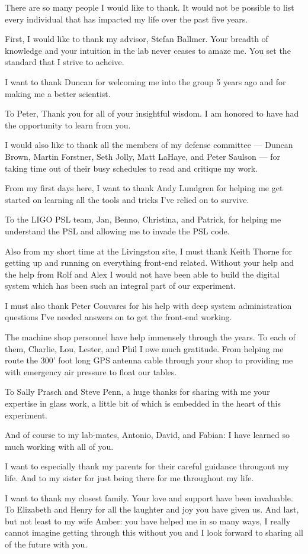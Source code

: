 There are so many people I would like to thank.
It would not be possible to list every individual that has impacted my life
over the past five years.

First, I would like to thank my advisor, Stefan Ballmer. Your
breadth of knowledge and your intuition in the lab never ceases to amaze me.
You set the standard that I strive to acheive.

I want to thank Duncan for welcoming me into the group 5 years ago and for
making me a better scientist.

To Peter, Thank you for all of your insightful wisdom. I am honored to have
had the opportunity to learn from you.

I would also like to thank all the members of my defense committee --- 
Duncan Brown, Martin Forstner, Seth Jolly, Matt LaHaye, and Peter Saulson ---
for taking time out of their busy schedules to read and critique my work.

From my first days here, I want to thank Andy Lundgren for helping me get
started on learning all the tools and tricks I've relied on to survive.

To the LIGO PSL team, Jan, Benno, Christina, and Patrick, for helping me
understand the PSL and allowing me to invade the PSL code.

Also from my short time at the Livingston site, I must thank Keith Thorne for
getting up and running on everything front-end related. Without your help and
the help from Rolf and Alex I would not have been able to build the digital
system which has been such an integral part of our experiment.

I must also thank Peter Couvares for his help with deep system administration
questions I've needed answers on to get the front-end working.

The machine shop personnel have help immensely through the years. To each of
them, Charlie, Lou, Lester, and Phil I owe much gratitude. From helping me
route the 300' foot long GPS antenna cable through your shop to
providing me with emergency air pressure to float our tables.

To Sally Prasch and Steve Penn, a huge thanks for sharing with me your
expertise in glass work, a little bit of which is embedded in the heart of
this experiment.

And of course to my lab-mates, Antonio, David, and Fabian: I have learned so
much working with all of you.

I want to especially thank my parents for their careful guidance througout my
life. And to my sister for just being there for me throughout my life.

I want to thank my closest family. Your love and support have been invaluable.
To Elizabeth and Henry for all the laughter and joy you have given us.
And last, but not least to my wife Amber: you have helped me in so many ways,
I really cannot imagine getting through this without you and I look forward to
sharing all of the future with you.



